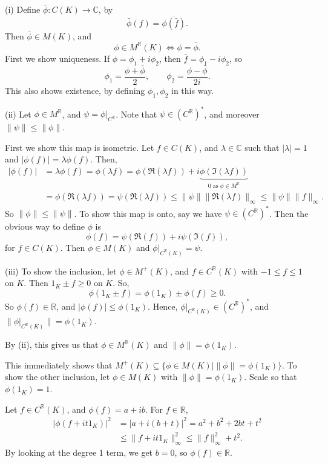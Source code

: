 \documentclass[12pt]{article}
\begin{document}
\begin{proofbox}
	

	(i) Define $\bar \phi : C(K) \to \mathbb{C}$, by
	\[
	\bar \phi(f) = \overline{\phi(\bar f)}.
	\]
	Then $\bar \phi \in M(K)$, and
	\[
	\phi \in M^{\mathbb{R}}(K) \iff \phi = \bar \phi.
	\]
	First we show uniqueness. If $\phi = \phi_1 + i \phi_2$, then $\bar f = \phi_1 - i \phi_2$, so
	\[
	\phi_1 = \frac{\phi + \bar \phi}{2}, \qquad \phi_2 = \frac{\phi - \bar \phi}{2i}.
	\]
	This also shows existence, by defining $\phi_1, \phi_2$ in this way.

	(ii) Let $\phi \in M^{\mathbb{R}}$, and $\psi = \phi|_{C^{\mathbb{R}}}$. Note that $\psi \in (C^{\mathbb{R}})^{\ast}$, and moreover $\|\psi\| \leq \|\phi\|$.

	First we show this map is isometric. Let $f \in C(K)$, and $\lambda \in \mathbb{C}$ such that $|\lambda| = 1$ and $|\phi(f)| = \lambda \phi(f)$. Then,
	\begin{align*}
		|\phi(f)| &= \lambda \phi(f) = \phi(\lambda f) = \phi(\Re(\lambda f)) + i \underbrace{\phi(\Im(\lambda f))}_{0 \text{ as } \phi \in M^{\mathbb{R}}} \\
			  &= \phi(\Re(\lambda f)) = \psi(\Re(\lambda f)) \leq \|\psi\| \|\Re(\lambda f)\|_\infty \leq \|\psi\| \|f\|_\infty.
	\end{align*}
	So $\|\phi\| \leq \|\psi\|$. To show this map is onto, say we have $\psi \in (C^{\mathbb{R}})^{\ast}$. Then the obvious way to define $\phi$ is
	\[
	\phi(f) = \psi(\Re(f)) + i \psi(\Im(f)),
	\]
	for $f \in C(K)$. Then $\phi \in M(K)$ and $\phi|_{C^{\mathbb{R}}(K)} = \psi$.

	(iii) To show the inclusion, let $\phi \in M^{+}(K)$, and $f \in C^{\mathbb{R}}(K)$ with $-1 \leq f \leq 1$ on $K$. Then $1_K \pm f \geq 0$ on $K$. So,
	\[
	\phi(1_K \pm f) = \phi(1_K) \pm \phi(f) \geq 0.
	\]
	So $\phi(f) \in \mathbb{R}$, and $|\phi(f)| \leq \phi(1_K)$. Hence, $\phi|_{C^{\mathbb{R}}(K)} \in (C^{\mathbb{R}})^{\ast}$, and $\|\phi|_{C^{\mathbb{R}}(K)}\| = \phi(1_K)$.

	By (ii), this gives us that $\phi \in M^{\mathbb{R}}(K)$ and $\|\phi\| = \phi(1_K)$.

	This immediately shows that $M^{+}(K) \subseteq \{\phi \in M(K) \mid \|\phi\| = \phi(1_K)\}$. To show the other inclusion, let $\phi \in M(K)$ with $\|\phi\| = \phi(1_K)$. Scale so that $\phi(1_K) = 1$.

	Let $f \in C^{\mathbb{R}}(K)$, and $\phi(f) = a + ib$. For $f \in \mathbb{R}$,
	\begin{align*}
		|\phi(f + it 1_K)|^2 &= |a + i(b + t)|^2 = a^2 + b^2 + 2bt + t^2 \\
				     &\leq \|f + it1_K\|^2_\infty \leq \|f\|_\infty^2 + t^2.
	\end{align*}
	By looking at the degree 1 term, we get $b = 0$, so $\phi(f) \in \mathbb{R}$.


\end{proofbox}
\end{document}
